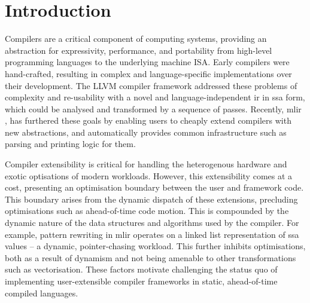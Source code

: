 \chapter{Introduction}
\label{chap:introduction}






Compilers are a critical component of computing systems, providing an abstraction for expressivity, performance, and portability from high-level programming languages to the underlying machine ISA.
Early compilers were hand-crafted, resulting in complex and language-specific implementations over their development.
The LLVM compiler framework \cite{lattnerLLVMCompilationFramework2004} addressed these problems of complexity and re-usability with a novel and language-independent \ac{ir} in \ac{ssa} form, which could be analysed and transformed by a sequence of passes.
Recently, \ac{mlir} \cite{lattnerMLIRScalingCompiler2021a}, has furthered these goals by enabling users to cheaply extend compilers with new abstractions, and automatically provides common infrastructure such as parsing and printing logic for them.





Compiler extensibility is critical for handling the heterogenous hardware and exotic optisations of modern workloads.
However, this extensibility comes at a cost, presenting an optimisation boundary between the user and framework code. This boundary arises from the dynamic dispatch of these extensions, precluding optimisations such as ahead-of-time code motion.
This is compounded by the dynamic nature of the data structures and algorithms used by the compiler. For example, pattern rewriting in \ac{mlir} operates on a linked list representation of \ac{ssa} values -- a dynamic, pointer-chasing workload.
This further inhibits optimisations, both as a result of dynamism and not being amenable to other transformations such as vectorisation.
These factors motivate challenging the status quo of implementing user-extensible compiler frameworks in static, ahead-of-time compiled languages.







